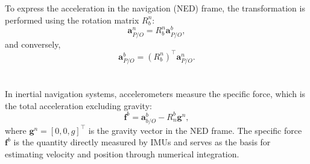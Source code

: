 \\ \\
To express the acceleration in the navigation (NED) frame, the transformation is performed using the rotation matrix $R_b^n$:  
$$
    \mathbf{a}_{P/O}^{n} = R_b^n \mathbf{a}_{P/O}^{b},
$$
and conversely,  
$$
    \mathbf{a}_{P/O}^{b} = (R_b^n)^\top \mathbf{a}_{P/O}^{n}.
$$
\\ \\
In inertial navigation systems, accelerometers measure the specific force, which is the total acceleration excluding gravity:  
$$
    \mathbf{f}^b = \mathbf{a}_{b/O}^{b} - R_n^b \mathbf{g}^n,
$$
where $\mathbf{g}^n = [0, 0, g]^\top$ is the gravity vector in the NED frame. The specific force $\mathbf{f}^b$ is the quantity directly measured by IMUs and serves as the basis for estimating velocity and position through numerical integration.
